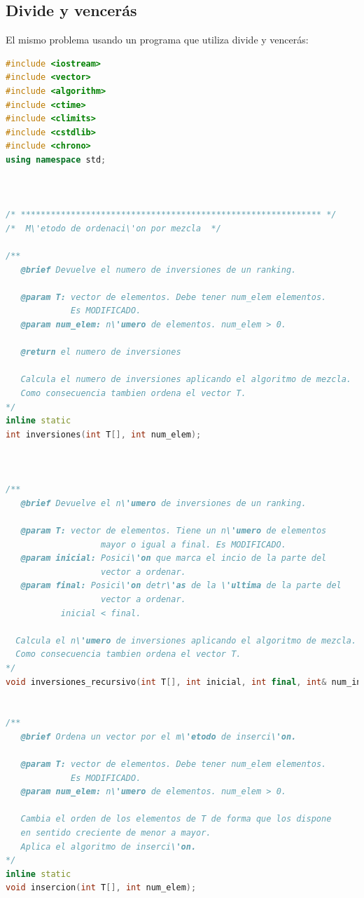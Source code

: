 \subsection{Divide y vencer\'as}
El mismo problema usando un programa que utiliza divide y vencer\'as:

\begin{lstlisting}[language=c++]
#include <iostream>
#include <vector>
#include <algorithm>
#include <ctime>
#include <climits>
#include <cstdlib>
#include <chrono>
using namespace std;



/* ************************************************************ */
/*  M\'etodo de ordenaci\'on por mezcla  */

/**
   @brief Devuelve el numero de inversiones de un ranking.

   @param T: vector de elementos. Debe tener num_elem elementos.
             Es MODIFICADO.
   @param num_elem: n\'umero de elementos. num_elem > 0.

   @return el numero de inversiones

   Calcula el numero de inversiones aplicando el algoritmo de mezcla.
   Como consecuencia tambien ordena el vector T.
*/
inline static
int inversiones(int T[], int num_elem);



/**
   @brief Devuelve el n\'umero de inversiones de un ranking.

   @param T: vector de elementos. Tiene un n\'umero de elementos
                   mayor o igual a final. Es MODIFICADO.
   @param inicial: Posici\'on que marca el incio de la parte del
                   vector a ordenar.
   @param final: Posici\'on detr\'as de la \'ultima de la parte del
                   vector a ordenar.
		   inicial < final.

  Calcula el n\'umero de inversiones aplicando el algoritmo de mezcla.
  Como consecuencia tambien ordena el vector T.
*/
void inversiones_recursivo(int T[], int inicial, int final, int& num_inversiones);


/**
   @brief Ordena un vector por el m\'etodo de inserci\'on.

   @param T: vector de elementos. Debe tener num_elem elementos.
             Es MODIFICADO.
   @param num_elem: n\'umero de elementos. num_elem > 0.

   Cambia el orden de los elementos de T de forma que los dispone
   en sentido creciente de menor a mayor.
   Aplica el algoritmo de inserci\'on.
*/
inline static
void insercion(int T[], int num_elem);



\end{lstlisting}

